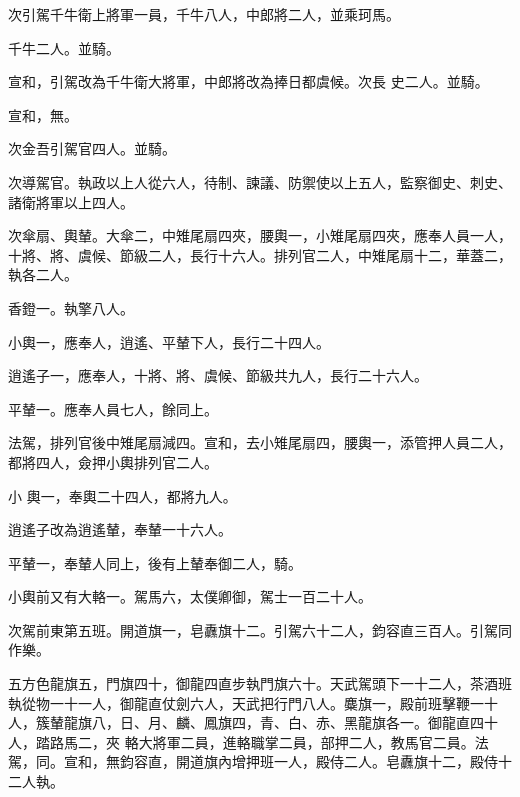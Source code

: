 \begin{pinyinscope}
 次引駕千牛衛上將軍一員，千牛八人，中郎將二人，並乘珂馬。



 千牛二人。並騎。



 宣和，引駕改為千牛衛大將軍，中郎將改為捧日都虞候。次長
 史二人。並騎。



 宣和，無。



 次金吾引駕官四人。並騎。



 次導駕官。執政以上人從六人，待制、諫議、防禦使以上五人，監察御史、刺史、諸衛將軍以上四人。



 次傘扇、輿輦。大傘二，中雉尾扇四夾，腰輿一，小雉尾扇四夾，應奉人員一人，十將、將、虞候、節級二人，長行十六人。排列官二人，中雉尾扇十二，華蓋二，執各二人。



 香鐙一。執擎八人。



 小輿一，應奉人，逍遙、平輦下人，長行二十四人。



 逍遙子一，應奉人，十將、將、虞候、節級共九人，長行二十六人。



 平輦一。應奉人員七人，餘同上。



 法駕，排列官後中雉尾扇減四。宣和，去小雉尾扇四，腰輿一，添管押人員二人，都將四人，僉押小輿排列官二人。



 小
 輿一，奉輿二十四人，都將九人。



 逍遙子改為逍遙輦，奉輦一十六人。



 平輦一，奉輦人同上，後有上輦奉御二人，騎。



 小輿前又有大輅一。駕馬六，太僕卿御，駕士一百二十人。



 次駕前東第五班。開道旗一，皂纛旗十二。引駕六十二人，鈞容直三百人。引駕同作樂。



 五方色龍旗五，門旗四十，御龍四直步執門旗六十。天武駕頭下一十二人，茶酒班執從物一十一人，御龍直仗劍六人，天武把行門八人。麋旗一，殿前班擊鞭一十人，簇輦龍旗八，日、月、麟、鳳旗四，青、白、赤、黑龍旗各一。御龍直四十人，踏路馬二，夾
 輅大將軍二員，進輅職掌二員，部押二人，教馬官二員。法駕，同。宣和，無鈞容直，開道旗內增押班一人，殿侍二人。皂纛旗十二，殿侍十二人執。




\end{pinyinscope}
